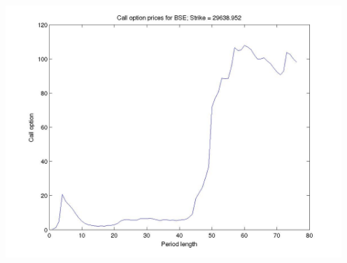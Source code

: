 \documentclass[12pt]{article}
\begin{document}
\begin{center}
      \includegraphics[width=5in]{call_strike10.jpg}
    \end{center}
\end{document}
